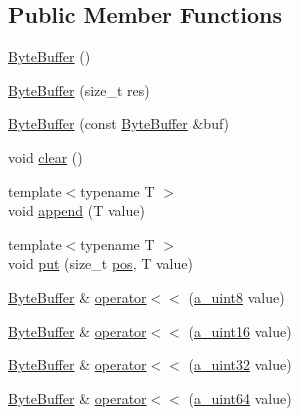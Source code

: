 \subsection*{Public Member Functions}
\begin{DoxyCompactItemize}
\item 
\hyperlink{class_agmd_network_1_1_byte_buffer_a4f9412492030e4add7e579adbe19641a}{Byte\+Buffer} ()
\item 
\hyperlink{class_agmd_network_1_1_byte_buffer_af59d49bb8689315350a15323707022e1}{Byte\+Buffer} (size\+\_\+t res)
\item 
\hyperlink{class_agmd_network_1_1_byte_buffer_a13b082150229f1258bc250f1fc7b191e}{Byte\+Buffer} (const \hyperlink{class_agmd_network_1_1_byte_buffer}{Byte\+Buffer} \&buf)
\item 
void \hyperlink{class_agmd_network_1_1_byte_buffer_a0f863fe52dc49cc9b2d46650cffbfc34}{clear} ()
\item 
{\footnotesize template$<$typename T $>$ }\\void \hyperlink{class_agmd_network_1_1_byte_buffer_ad1f64e19c6c0b4039c7b356393cec1dc}{append} (T value)
\item 
{\footnotesize template$<$typename T $>$ }\\void \hyperlink{class_agmd_network_1_1_byte_buffer_a0f3a65bb64d898373d4f0def1ccdddce}{put} (size\+\_\+t \hyperlink{_examples_2_planet_2_app_8cpp_aa8a1c0491559faca4ebd0881575ae7f0}{pos}, T value)
\item 
\hyperlink{class_agmd_network_1_1_byte_buffer}{Byte\+Buffer} \& \hyperlink{class_agmd_network_1_1_byte_buffer_add1f6ffac7a90a65d03fc152868df89b}{operator$<$$<$} (\hyperlink{_common_defines_8h_afbe6c09973474a1f78f870f39073398f}{a\+\_\+uint8} value)
\item 
\hyperlink{class_agmd_network_1_1_byte_buffer}{Byte\+Buffer} \& \hyperlink{class_agmd_network_1_1_byte_buffer_a0110ac6a30e9f563b88c3e28ee65307f}{operator$<$$<$} (\hyperlink{_common_defines_8h_a7e7afab9b2de210021aed9953c6b367f}{a\+\_\+uint16} value)
\item 
\hyperlink{class_agmd_network_1_1_byte_buffer}{Byte\+Buffer} \& \hyperlink{class_agmd_network_1_1_byte_buffer_ae5cd9a97be8586ca64d3a8976905aedd}{operator$<$$<$} (\hyperlink{_common_defines_8h_a964296f9770051b9e4807b1f180dd416}{a\+\_\+uint32} value)
\item 
\hyperlink{class_agmd_network_1_1_byte_buffer}{Byte\+Buffer} \& \hyperlink{class_agmd_network_1_1_byte_buffer_a125772d3592dffdce850d02b52d95c15}{operator$<$$<$} (\hyperlink{_common_defines_8h_a6c5192ec3c55d6e5b13d2dbaa082bdea}{a\+\_\+uint64} value)

\end{DoxyCompactItemize}
